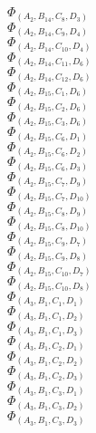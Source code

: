 \documentclass[14pt]{article}
\begin{document}
    $\Phi_{({A}_{2}, {B}_{14}, {C}_{8}, {D}_{3})}$ \\ 
    $\Phi_{({A}_{2}, {B}_{14}, {C}_{9}, {D}_{4})}$ \\ 
    $\Phi_{({A}_{2}, {B}_{14}, {C}_{10}, {D}_{4})}$ \\ 
    $\Phi_{({A}_{2}, {B}_{14}, {C}_{11}, {D}_{6})}$ \\ 
    $\Phi_{({A}_{2}, {B}_{14}, {C}_{12}, {D}_{6})}$ \\ 
    $\Phi_{({A}_{2}, {B}_{15}, {C}_{1}, {D}_{6})}$ \\ 
    $\Phi_{({A}_{2}, {B}_{15}, {C}_{2}, {D}_{6})}$ \\ 
    $\Phi_{({A}_{2}, {B}_{15}, {C}_{3}, {D}_{6})}$ \\ 
    $\Phi_{({A}_{2}, {B}_{15}, {C}_{6}, {D}_{1})}$ \\ 
    $\Phi_{({A}_{2}, {B}_{15}, {C}_{6}, {D}_{2})}$ \\ 
    $\Phi_{({A}_{2}, {B}_{15}, {C}_{6}, {D}_{3})}$ \\ 
    $\Phi_{({A}_{2}, {B}_{15}, {C}_{7}, {D}_{9})}$ \\ 
    $\Phi_{({A}_{2}, {B}_{15}, {C}_{7}, {D}_{10})}$ \\ 
    $\Phi_{({A}_{2}, {B}_{15}, {C}_{8}, {D}_{9})}$ \\ 
    $\Phi_{({A}_{2}, {B}_{15}, {C}_{8}, {D}_{10})}$ \\ 
    $\Phi_{({A}_{2}, {B}_{15}, {C}_{9}, {D}_{7})}$ \\ 
    $\Phi_{({A}_{2}, {B}_{15}, {C}_{9}, {D}_{8})}$ \\ 
    $\Phi_{({A}_{2}, {B}_{15}, {C}_{10}, {D}_{7})}$ \\ 
    $\Phi_{({A}_{2}, {B}_{15}, {C}_{10}, {D}_{8})}$ \\ 
    $\Phi_{({A}_{3}, {B}_{1}, {C}_{1}, {D}_{1})}$ \\ 
    $\Phi_{({A}_{3}, {B}_{1}, {C}_{1}, {D}_{2})}$ \\ 
    $\Phi_{({A}_{3}, {B}_{1}, {C}_{1}, {D}_{3})}$ \\ 
    $\Phi_{({A}_{3}, {B}_{1}, {C}_{2}, {D}_{1})}$ \\ 
    $\Phi_{({A}_{3}, {B}_{1}, {C}_{2}, {D}_{2})}$ \\ 
    $\Phi_{({A}_{3}, {B}_{1}, {C}_{2}, {D}_{3})}$ \\ 
    $\Phi_{({A}_{3}, {B}_{1}, {C}_{3}, {D}_{1})}$ \\ 
    $\Phi_{({A}_{3}, {B}_{1}, {C}_{3}, {D}_{2})}$ \\ 
    $\Phi_{({A}_{3}, {B}_{1}, {C}_{3}, {D}_{3})}$ \\ 
\end{document}
